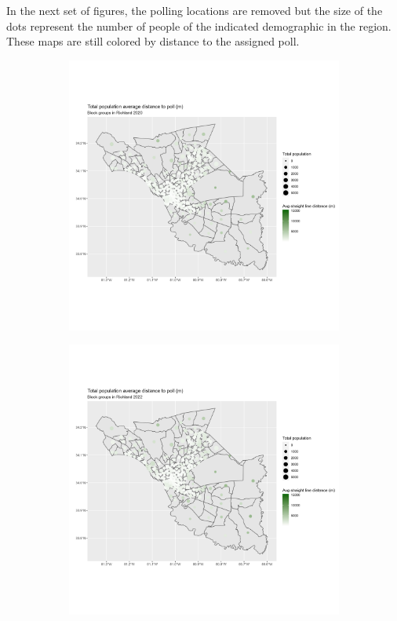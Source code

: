 \documentclass[11pt]{article}
\theoremstyle{remark}
\theoremstyle{definition}
\begin{document}
In the next set of figures, the polling locations are removed but the size of the dots represent the number of people of the indicated demographic in the region. These maps are still colored by distance to the assigned poll.

\begin{figure}
	\begin{subfigure}{.5\textwidth}
		\centering
		\includegraphics[width=\linewidth]{result analysis/Richland_SC_original_configs/population_pop_and_dist_Richland_config_original_2020_polls.png}
		\label{sfig:York_2020_bg_dist_pop}
	\end{subfigure} 
	\begin{subfigure}{.5\textwidth}
		\centering
		\includegraphics[width=\linewidth]{result analysis/Richland_SC_original_configs/population_pop_and_dist_Richland_config_original_2022_polls.png}

\end{subfigure}
\end{figure}
\end{document}
